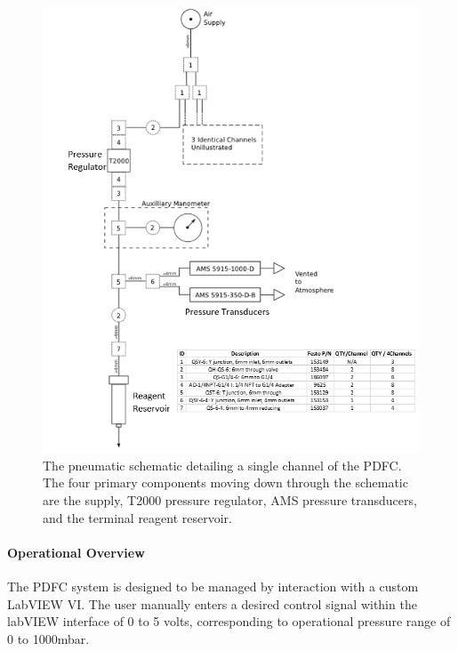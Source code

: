 \begin{figure}[H]
\centering 
\includegraphics[width=1.0\columnwidth]{pneumaticSchematic.PNG} 
\caption[Pneumatic Schematic of PDFC channel]{The pneumatic schematic detailing a single channel of the PDFC. The four primary components moving down through the schematic are the supply, T2000 pressure regulator, AMS pressure transducers, and the terminal reagent reservoir.} 
\label{fig:pneumaticSchematic} 
\end{figure}

\clearpage

\paragraph{Operational Overview} The PDFC system is designed to be managed by interaction with a custom LabVIEW VI. The user manually enters a desired control signal within the labVIEW interface of 0 to 5 volts, corresponding to operational pressure range of 0 to 1000mbar.

